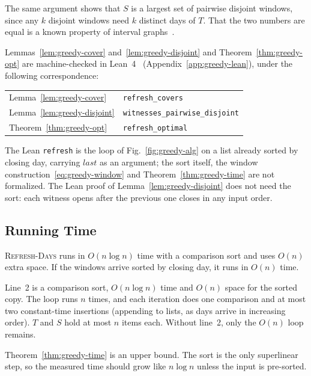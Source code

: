 The same argument shows that $S$ is a largest set of pairwise disjoint
windows, since any $k$ disjoint windows need $k$ distinct days of $T$. That
the two numbers are equal is a known property of interval
graphs~\cite{golumbic2004algorithmic}.

Lemmas~\ref{lem:greedy-cover} and~\ref{lem:greedy-disjoint} and
Theorem~\ref{thm:greedy-opt} are machine-checked in Lean~4~\cite{lean4}
(Appendix~\ref{app:greedy-lean}), under the following correspondence:
\begin{center}\small
\begin{tabular}{@{}ll@{}}
Lemma~\ref{lem:greedy-cover} & \texttt{refresh\_covers}\\
Lemma~\ref{lem:greedy-disjoint} & \texttt{witnesses\_pairwise\_disjoint}\\
Theorem~\ref{thm:greedy-opt} & \texttt{refresh\_optimal}
\end{tabular}
\end{center}
The Lean \texttt{refresh} is the loop of Fig.~\ref{fig:greedy-alg} on a list
already sorted by closing day, carrying $\mathit{last}$ as an argument; the
sort itself, the window construction~\eqref{eq:greedy-window} and
Theorem~\ref{thm:greedy-time} are not formalized. The Lean proof of
Lemma~\ref{lem:greedy-disjoint} does not need the sort: each witness opens
after the previous one closes in any input order.

\subsection{Running Time}
\label{sec:greedy-analysis}

\begin{theorem}\label{thm:greedy-time}
\textsc{Refresh-Days} runs in $O(n\log n)$ time with a comparison sort and
uses $O(n)$ extra space. If the windows arrive sorted by closing day, it runs
in $O(n)$ time.
\end{theorem}
\begin{IEEEproof}
Line~2 is a comparison sort, $O(n\log n)$ time and $O(n)$ space for the
sorted copy. The loop runs $n$ times, and each iteration does one comparison
and at most two constant-time insertions (appending to lists, as days arrive
in increasing order). $T$ and $S$ hold at most $n$ items each. Without
line~2, only the $O(n)$ loop remains.
\end{IEEEproof}

Theorem~\ref{thm:greedy-time} is an upper bound. The sort is the only
superlinear step, so the measured time should grow like $n\log n$ unless the
input is pre-sorted.

